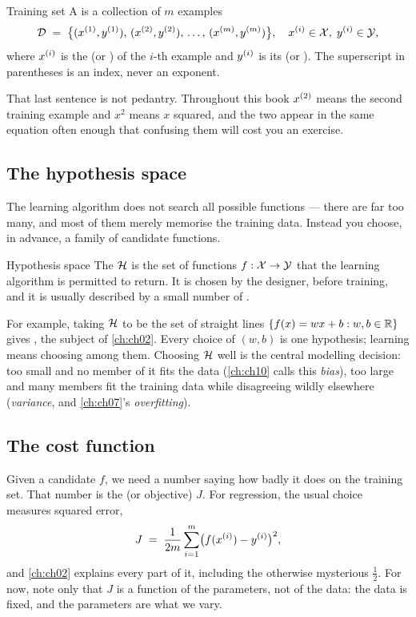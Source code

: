 \begin{defbox}{Training set}
A  is a collection of $m$ examples
\[
  \mathcal{D} \;=\; \bigl\{(x^{(1)},y^{(1)}),\,(x^{(2)},y^{(2)}),\,\dots,\,
                     (x^{(m)},y^{(m)})\bigr\},
  \quad x^{(i)}\in\mathcal{X},\; y^{(i)}\in\mathcal{Y},
\]
where $x^{(i)}$ is the  (or ) of the $i$-th example and
$y^{(i)}$ is its  (or ). The superscript in parentheses
is an index, never an exponent.
\end{defbox}

That last sentence is not pedantry. Throughout this book $x^{(2)}$ means the
second training example and $x^2$ means $x$ squared, and the two appear in the
same equation often enough that confusing them will cost you an exercise.

\subsection{The hypothesis space}

The learning algorithm does not search all possible functions --- there are far
too many, and most of them merely memorise the training data. Instead you choose,
in advance, a family of candidate functions.

\begin{defbox}{Hypothesis space}
The  $\mathcal{H}$ is the set of functions
$f:\mathcal{X}\to\mathcal{Y}$ that the learning algorithm is permitted to return. It is
chosen by the designer, before training, and it is usually described by a small
number of .
\end{defbox}

For example, taking $\mathcal{H}$ to be the set of straight lines
$\{f(x)=wx+b : w,b\in\mathbb{R}\}$ gives , the subject of
\cref{ch:ch02}. Every choice of $(w,b)$ is one hypothesis; learning means
choosing among them. Choosing $\mathcal{H}$ well is the central modelling decision:
too small and no member of it fits the data (\cref{ch:ch10} calls this
\emph{bias}), too large and many members fit the training data while disagreeing
wildly elsewhere (\emph{variance}, and \cref{ch:ch07}'s \emph{overfitting}).

\subsection{The cost function}

Given a candidate $f$, we need a number saying how badly it does on the training
set. That number is the  (or objective) $J$. For regression, the usual
choice measures squared error,
\[
  J \;=\; \frac{1}{2m}\sum_{i=1}^{m}\bigl(f(x^{(i)}) - y^{(i)}\bigr)^2 ,
\]
and \cref{ch:ch02} explains every part of it, including the otherwise mysterious
$\tfrac12$. For now, note only that $J$ is a function of the parameters, not of
the data: the data is fixed, and the parameters are what we vary.

